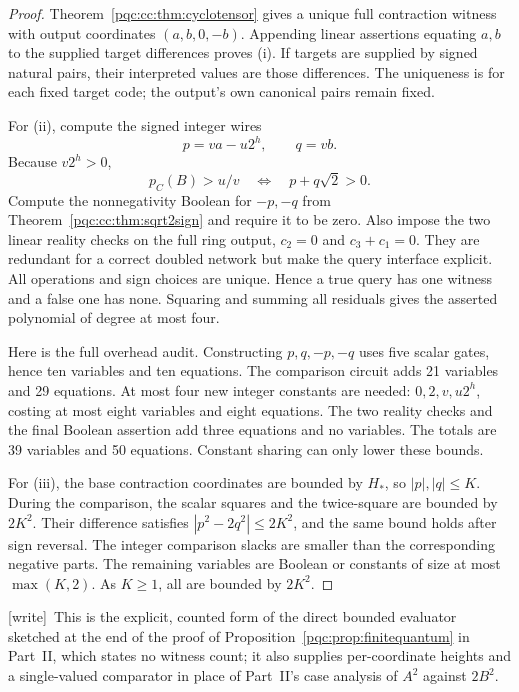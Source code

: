 \documentclass[11pt,letterpaper]{article}
\numberwithin{equation}{section}
\theoremstyle{definition}
\theoremstyle{remark}
\newcommand{\wtag}{\textup{[write]}}
\begin{document}
\begin{proof}
Theorem~\ref{pqc:cc:thm:cyclotensor} gives a unique full contraction witness with output
coordinates $(a,b,0,-b)$. Appending linear assertions equating $a,b$ to the
supplied target differences proves (i). If targets are supplied by signed
natural pairs, their interpreted values are those differences. The uniqueness
is for each fixed target code; the output's own canonical pairs remain fixed.

For (ii), compute the signed integer wires
\begin{equation}
 p=va-u2^h,\qquad q=vb.
\label{pqc:cc:eq:thresholdcoords}
\end{equation}
Because $v2^h>0$,
\[
 p_C(B)>u/v\quad\Longleftrightarrow\quad p+q\sqrt2>0.
\]
Compute the nonnegativity Boolean for $-p,-q$ from
Theorem~\ref{pqc:cc:thm:sqrt2sign} and require it to be zero. Also impose the two
linear reality checks on the full ring output, $c_2=0$ and $c_3+c_1=0$.
They are redundant for a correct doubled network but make the query interface
explicit. All operations and sign choices are unique. Hence a true query has
one witness and a false one has none. Squaring and summing all residuals gives
the asserted polynomial of degree at most four.

Here is the full overhead audit. Constructing $p,q,-p,-q$ uses five scalar
gates, hence ten variables and ten equations. The comparison circuit adds 21
variables and 29 equations. At most four new integer constants are needed:
$0,2,v,u2^h$, costing at most eight variables and eight equations. The two
reality checks and the final Boolean assertion add three equations and no
variables. The totals are 39 variables and 50 equations. Constant sharing can
only lower these bounds.

For (iii), the base contraction coordinates are bounded by $H_*$, so
$|p|,|q|\le K$. During the comparison, the scalar squares and the twice-square
are bounded by $2K^2$. Their difference satisfies
$|p^2-2q^2|\le2K^2$, and the same bound holds after sign reversal. The integer
comparison slacks are smaller than the corresponding negative parts. The
remaining variables are Boolean or constants of size at most $\max(K,2)$.
As $K\ge1$, all are bounded by $2K^2$.
\end{proof}
\wtag\ This is the explicit, counted form of the direct bounded evaluator sketched at the end of the proof of Proposition~\ref{pqc:prop:finitequantum} in Part~II, which states no witness count; it also supplies per-coordinate heights and a single-valued comparator in place of Part~II's case analysis of $A^2$ against $2B^2$.
\end{document}
